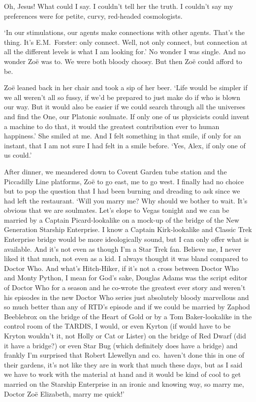 Oh, Jesus! What could I say. I couldn't tell her the truth. I
couldn't say my preferences were for petite, curvy, red-headed
cosmologists.

`In our stimulations, our agents make connections with other agents.
That's the thing. It's E.M.~Forster: only connect. Well, not
{\twelveit only\/} connect, but connection at all the different
levels is what I am looking for.' No wonder I was single. And no
wonder Zoë was to. We were both bloody choosy. But then Zoë
could afford to be.

Zoë leaned back in her chair and took a sip of her beer. `Life
would be simpler if we all weren't all so fussy, if we'd be prepared
to just make do if who is blown our way. But it would also be easier
if we could search through all the universes and find the One, our
Platonic soulmate. If only one of us physicists could invent a
machine to do that, it would the greatest contribution ever to human
happiness.' She smiled at me. And I felt something in that smile, if
only for an instant, that I am not sure I had felt in a smile
before. `Yes, Alex, if only one of us could.'

After dinner, we meandered down to Covent Garden tube station and
the Piccadilly Line platforms, Zoë to go east, me to go west. I
finally had no choice but to pop the question that I had been
burning and dreading to ask since we had left the restaurant. `Will
you marry me? Why should we bother to wait. It's obvious that we are
soulmates. Let's elope to Vegas tonight and we can be married by a
Captain Picard-lookalike on a mock-up of the bridge of the
{\twelvesl New Generation\/} Starship {\twelvesl Enterprise}. I know
a Captain Kirk-lookalike and Classic {\twelvesl Trek\/} {\twelvesl
Enterprise\/} bridge would be more ideologically sound, but I can
only offer what is available. And it's not even as though I'm a
{\twelvesl Star Trek\/} fan. Believe me, I never liked it that much,
not even as a kid. I always thought it was bland compared to
{\twelvesl Doctor Who}. And what's {\twelvesl Hitch-Hiker\/}, if
it's not a cross between {\twelvesl Doctor Who\/} and {\twelvesl
Monty Python\/}, I mean for God's sake, Douglas Adams was the script
editor of {\twelvesl Doctor Who\/} for a season and he co-wrote the
greatest ever story and weren't his episodes in the new {\twelvesl
Doctor Who\/} series just absolutely bloody marvellous and so much
better than any of RTD's episode and if we could be married by
Zaphod Beeblebrox on the bridge of the {\twelvesl Heart of Gold\/}
or by a Tom Baker-lookalike in the control room of the TARDIS, I
would, or even Kyrton (if would have to be Kryton wouldn't it, not
Holly or Cat or Lister) on the bridge of {\twelvesl Red Dwarf} (did
it have a bridge?) or even {\twelvesl Star Bug} (which definitely
does have a bridge) and frankly I'm surprised that Robert Llewellyn
and co.~haven't done this in one of their gardens, it's not like
they are in work that much these days, but as I said we have to work
with the material at hand and it would be kind of cool to get
married on the Starship {\twelvesl Enterprise\/} in an ironic and
knowing way, so marry me, Doctor Zoë Elizabeth, marry me quick!'

